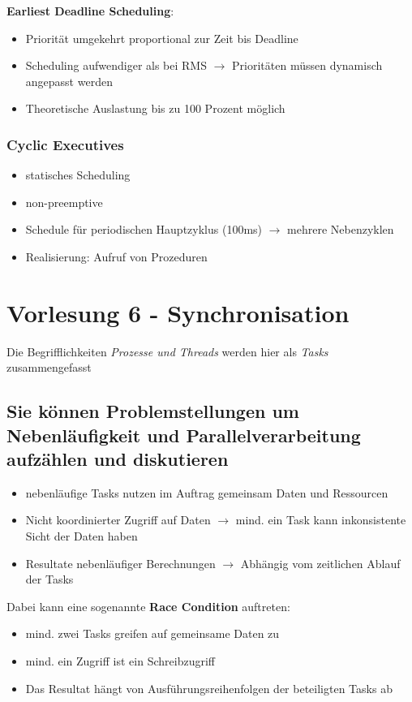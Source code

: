\documentclass{report}
\theoremstyle{definition}
\theoremstyle{example}
\begin{document}
\textbf{Earliest Deadline Scheduling}:
\begin{itemize}
	\item Priorität umgekehrt proportional zur Zeit bis Deadline
	\item Scheduling aufwendiger als bei RMS $\rightarrow$ Prioritäten müssen dynamisch angepasst werden
	\item Theoretische Auslastung bis zu 100 Prozent möglich
\end{itemize}

	\subsection{Cyclic Executives}
\begin{itemize}
	\item statisches Scheduling
	\item non-preemptive
	\item Schedule für periodischen Hauptzyklus (100ms) $\rightarrow$ mehrere Nebenzyklen
	\item Realisierung: Aufruf von Prozeduren
\end{itemize}

\chapter{Vorlesung 6 - Synchronisation}
Die Begrifflichkeiten \textit{Prozesse und Threads} werden hier als \textit{Tasks} zusammengefasst

\section{Sie können Problemstellungen um Nebenläufigkeit und Parallelverarbeitung aufzählen und diskutieren}
\begin{itemize}
	\item nebenläufige Tasks nutzen im Auftrag gemeinsam Daten und Ressourcen
	\item Nicht koordinierter Zugriff auf Daten $\rightarrow$ mind. ein Task kann inkonsistente Sicht der Daten haben
	\item Resultate nebenläufiger Berechnungen $\rightarrow$ Abhängig vom zeitlichen Ablauf der Tasks
\end{itemize}
Dabei kann eine sogenannte \textbf{Race Condition} auftreten:
\begin{itemize}
	\item mind. zwei Tasks greifen auf gemeinsame Daten zu
	\item mind. ein Zugriff ist ein Schreibzugriff
	\item Das Resultat hängt von Ausführungsreihenfolgen der beteiligten Tasks ab
\end{itemize}
\end{document}
